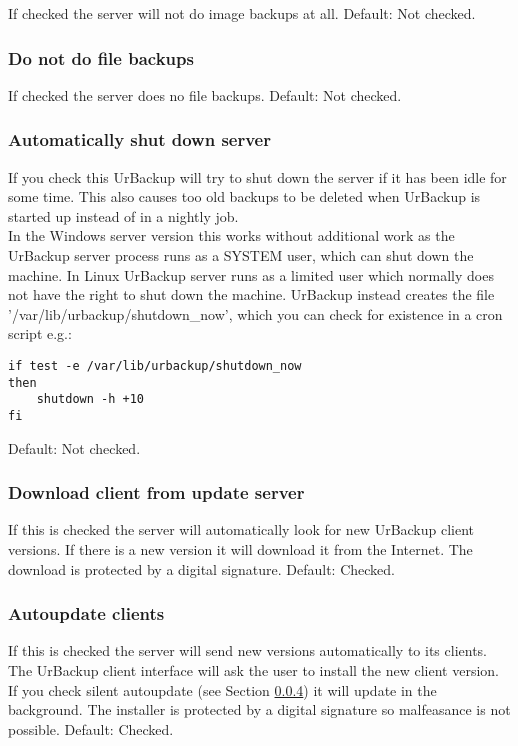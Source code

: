 \documentclass[a4paper,10pt]{article}
\begin{document}
If checked the server will not do image backups at all. Default: Not checked.

\subsubsection{Do not do file backups}

If checked the server does no file backups. Default: Not checked.

\subsubsection{Automatically shut down server}

If you check this UrBackup will try to shut down the server if it has been idle for some time. This also causes too old backups to be deleted when UrBackup is started up instead of in a nightly job.\\
In the Windows server version this works without additional work as the UrBackup
server process runs as a SYSTEM user, which can shut down the machine. In Linux
UrBackup server runs as a limited user which normally does not have the right to
shut down the machine. UrBackup instead creates the file
'/var/lib/urbackup/shutdown\_now', which you can check for existence in a cron
script e.g.:
\begin{verbatim}
if test -e /var/lib/urbackup/shutdown_now
then
	shutdown -h +10
fi
\end{verbatim}

Default: Not checked.

\subsubsection{Download client from update server}

If this is checked the server will automatically look for new UrBackup client
versions. If there is a new version it will download it from the Internet. The
download is protected by a digital signature. Default: Checked.

\subsubsection{Autoupdate clients}
\label{subsubsec:autoupdate}

If this is checked the server will send new versions automatically to its clients.
The UrBackup client interface will ask the user to
install the new client version. If you check silent autoupdate (see Section \ref{subsubsec:autoupdate})
it will update in the background.
The installer is protected by a digital signature so malfeasance is not possible. Default: Checked.
\end{document}
